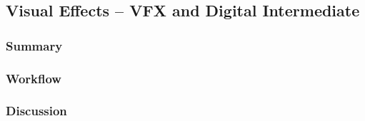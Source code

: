 \subsection{Visual Effects -- VFX and Digital Intermediate} \label{subsec:ff-vfx}

	\subsubsection{Summary}
	
	\lipsum[1] %
	
	\subsubsection{Workflow}
	
	\lipsum[1] %
	
	\subsubsection{Discussion}
	
	\lipsum[1] %